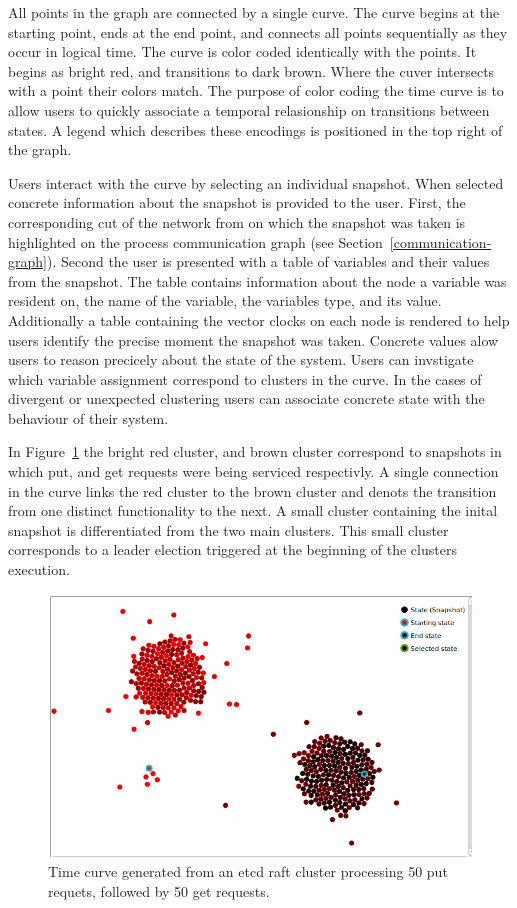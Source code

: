 All points in the graph are connected by a single curve. The curve
begins at the starting point, ends at the end point, and connects all
points sequentially as they occur in logical time. The curve is color
coded identically with the points. It begins as bright red, and
transitions to dark brown. Where the cuver intersects with a point
their colors match. The purpose of color coding the time curve is to
allow users to quickly associate a temporal relasionship on
transitions between states. A legend which describes these encodings
is positioned in the top right of the graph.

Users interact with the curve by selecting an individual snapshot.
When selected concrete information about the snapshot is provided to
the user. First, the corresponding cut of the network from on which
the snapshot was taken is highlighted on the process communication
graph (see Section~\ref{communication-graph}). Second the user is
presented with a table of variables and their values from the
snapshot. The table contains information about the node a variable was
resident on, the name of the variable, the variables type, and its
value. Additionally a table containing the vector clocks on each node
is rendered to help users identify the precise moment the snapshot was
taken. Concrete values alow users to reason precicely about the state
of the system. Users can invstigate which variable assignment
correspond to clusters in the curve. In the cases of divergent or
unexpected clustering users can associate concrete state with the
behaviour of their system.

In Figure~\ref{fig:put-get-curve} the bright red cluster, and brown
cluster correspond to snapshots in which put, and get requests were
being serviced respectivly. A single connection in the curve links the
red cluster to the brown cluster and denots the transition from one
distinct functionality to the next. A small cluster containing the
inital snapshot is differentiated from the two main clusters. This
small cluster corresponds to a leader election triggered at the
beginning of the clusters execution.

\begin{figure}[h]
    \includegraphics[width=\linewidth]{fig/put-get-curve}%
    \caption{Time curve generated from an etcd raft cluster processing 50 put requets, followed by 50 get requests.\label{fig:put-get-curve}}%
\end{figure}
    


